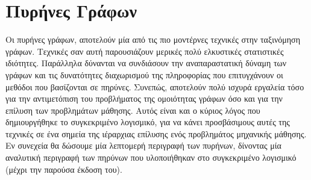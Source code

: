 \section{Πυρήνες Γράφων}
Οι πυρήνες γράφων, αποτελούν μία από τις πιο μοντέρνες τεχνικές στην ταξινόμηση γράφων.
Τεχνικές σαν αυτή παρουσιάζουν μερικές πολύ ελκυστικές στατιστικές ιδιότητες.
Παράλληλα δύνανται να συνδιάσουν την αναπαραστατική δύναμη των γράφων και τις δυνατότητες διαχωρισμού της πληροφορίας που επιτυγχάνουν οι μεθόδοι που βασίζονται σε πηρύνες.
Συνεπώς, αποτελούν πολύ ισχυρά εργαλεία τόσο για την αντιμετόπιση του προβλήματος της ομοιότητας γράφων όσο και για την επίλυση των προβλημάτων μάθησης.
Αυτός είναι και ο κύριος λόγος που δημιουργήθηκε το συγκεκριμένο λογισμικό, για να κάνει προσβάσιμους αυτές της τεχνικές σε ένα σημεία της ιέραρχιας επίλυσης ενός προβλημάτος μηχανικής μάθησης.
Εν συνεχεία θα δώσουμε μία λεπτομερή περιγραφή των πυρήνων, δίνοντας μία αναλυτική περιγραφή των πηρύνων που υλοποιήθηκαν στο συγκεκριμένο λογισμικό (μέχρι την παρούσα έκδοση του).
